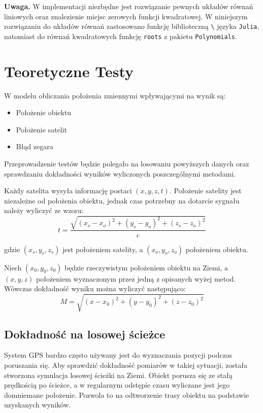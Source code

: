 \documentclass{article}
\begin{document}
\textbf{Uwaga.} \enspace W implementacji niezbędne jest rozwiązanie pewnych układów równań liniowych
oraz znalezienie miejsc zerowych funkcji kwadratowej. W niniejszym rozwiązaniu do układów równań zastosowano
funkcję biblioteczną \texttt{\textbackslash} języka \texttt{Julia}, natomiast do równań kwadratowych funkcję \texttt{roots}
z pakietu \texttt{Polynomials}.

\section{Teoretyczne Testy}
\par W modelu obliczania położenia zmiennymi wpływającymi na wynik są:
\begin{itemize}
 \item Położenie obiektu
 \item Położenie satelit
 \item Błąd zegara
\end{itemize}

Przeprowadzenie testów będzie polegało na losowaniu powyższych  danych oraz sprawdzaniu dokładności wyników wyliczonych poszczególnymi metodami.

\par Każdy satelita wysyła informację postaci $(x, y, z, t)$. Położenie satelity jest niezależne od położenia obiektu, jednak czas potrzebny na dotarcie sygnału należy wyliczyć ze wzoru:
	\begin{equation}
		\label{eq:time_test}
	 t = \frac{  \sqrt{ (x_s - x_o)^2 + (y_s-y_o)^2 + (z_s - z_o)^2 } }{c}
	 \end{equation}
	
	gdzie $(x_s, y_s, z_s)$ jest położeniem satelity, a $(x_o, y_o, z_o)$ położeniem obiektu.

\par Niech $(x_{0}, y_{0}, z_{0})$ będzie rzeczywistym położeniem obiektu na Ziemi, a $(x, y, z)$ położeniem wyznaczonym przez jedną z opisanych wyżej metod. Wówczas dokładność wyniku można wyliczyć następująco:
	$$ M = \sqrt{(x-x_{0})^2 +  (y-y_{0})^2 + (z - z_{0})^2} $$

\subsection{Dokładność na losowej ścieżce}
	System GPS bardzo często używany jest do wyznaczania pozycji podczas poruszania się.  Aby sprawdzić dokładność pomiarów w takiej sytuacji,  została stworzona symulacja losowej ścieżki na Ziemi. Obiekt porusza się ze stałą prędkością po ścieżce, a  w regularnym odstępie czasu wyliczane jest jego domniemane położenie. Pozwola to na odtworzenie trasy obiektu na podstawie uzyskanych wyników.
	
\end{document}
